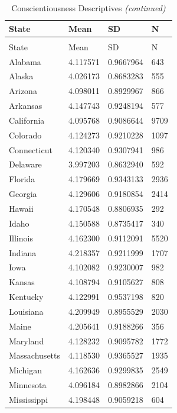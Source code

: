 \documentclass[
  english,
  man]{apa6}
\begin{document}
\begin{landscape}
\begin{longtable}[t]{llll}
\caption{\label{tab:KableOuput}Conscientiousness Descriptives}\\
\toprule
State & Mean & SD & N\\
\midrule
\endfirsthead
\caption[]{\label{tab:KableOuput}Conscientiousness Descriptives \textit{(continued)}}\\
\toprule
State & Mean & SD & N\\
\midrule
\endhead

\endfoot
\bottomrule
\endlastfoot
Alabama & 4.117571 & 0.9667964 & 643\\
Alaska & 4.026173 & 0.8683283 & 555\\
Arizona & 4.098011 & 0.8929967 & 866\\
Arkansas & 4.147743 & 0.9248194 & 577\\
California & 4.095768 & 0.9086644 & 9709\\
\addlinespace
Colorado & 4.124273 & 0.9210228 & 1097\\
Connecticut & 4.120340 & 0.9307941 & 986\\
Delaware & 3.997203 & 0.8632940 & 592\\
Florida & 4.179669 & 0.9343133 & 2936\\
Georgia & 4.129606 & 0.9180854 & 2414\\
\addlinespace
Hawaii & 4.170548 & 0.8806935 & 292\\
Idaho & 4.150588 & 0.8735417 & 340\\
Illinois & 4.162300 & 0.9112091 & 5520\\
Indiana & 4.218357 & 0.9211999 & 1707\\
Iowa & 4.102082 & 0.9230007 & 982\\
\addlinespace
Kansas & 4.108794 & 0.9105627 & 808\\
Kentucky & 4.122991 & 0.9537198 & 820\\
Louisiana & 4.209949 & 0.8955529 & 2030\\
Maine & 4.205641 & 0.9188266 & 356\\
Maryland & 4.128232 & 0.9095782 & 1772\\
\addlinespace
Massachusetts & 4.118530 & 0.9365527 & 1935\\
Michigan & 4.162636 & 0.9299835 & 2549\\
Minnesota & 4.096184 & 0.8982866 & 2104\\
Mississippi & 4.198448 & 0.9059218 & 604\\

\end{longtable}
\end{landscape}
\end{document}
